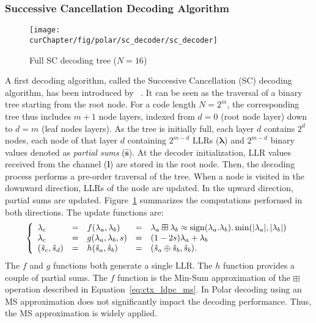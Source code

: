 \subsubsection{Successive Cancellation Decoding Algorithm}

\begin{figure}[htp]
  \centering
  \texttt{[image: \\curChapter/fig/polar/sc\_decoder/sc\_decoder]}
  \caption{Full SC decoding tree ($N = 16$)}
  \label{fig:ctx_polar_sc_decoder}
\end{figure}

A first decoding algorithm, called the Successive Cancellation (SC) decoding
algorithm, has been introduced by \Arikan~\cite{Arikan2009}. It can be seen as
the traversal of a binary tree starting from the root node. For a code length
$N=2^m$, the corresponding tree thus includes $m + 1$ node layers, indexed from
$d=0$ (root node layer) down to $d=m$ (leaf nodes layers). As the tree is
initially full, each layer $d$ contains $2^d$ nodes, each node of that layer $d$
containing $2^{m-d}$ LLRs ($\bm{\lambda}$) and $2^{m-d}$ binary values denoted
as \textit{partial sums} ($\bm{\hat{s}}$). At the decoder initialization, LLR
values received from the channel ($\bm{l}$) are stored in the root node. Then,
the decoding process performs a pre-order traversal of the tree. When a node is
visited in the downward direction, LLRs of the node are updated. In the upward
direction, partial sums are updated. Figure~\ref{fig:ctx_polar_sc_decoder}
summarizes the computations performed in both directions. The update functions
are:
\begin{eqnarray}
\left\{\begin{array}{l c l c l}
\lambda_c &=& f(\lambda_a,\lambda_b) &=& \lambda_a \boxplus \lambda_b \approx \operatorname*{sign}(\lambda_a.\lambda_b).\min(|\lambda_a|,|\lambda_b|)\\
\lambda_c &=& g(\lambda_a,\lambda_b,s)&=&(1-2s)\lambda_a+\lambda_b\\
(\hat{s}_{c}, \hat{s}_{d}) &=& h(\hat{s}_{a}, \hat{s}_{b}) &=& (\hat{s}_{a} \oplus \hat{s}_{b}, \hat{s}_{b}).
\end{array}\right.
\label{eq:ctx_polar_f_g_h}
\end{eqnarray}
The $f$ and $g$ functions both generate a single LLR. The $h$ function provides
a couple of partial sums. The $f$ function is the Min-Sum approximation of the
$\boxplus$ operation described in Equation~\ref{eq:ctx_ldpc_ms}. In Polar
decoding using an MS approximation does not significantly impact the decoding
performance. Thus, the MS approximation is widely applied.

